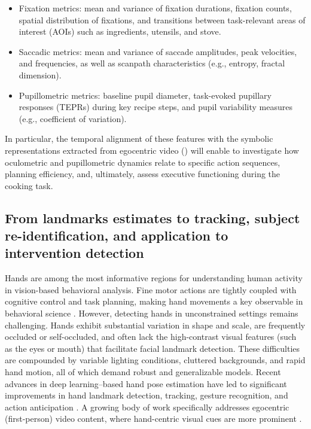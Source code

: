     \begin{itemize}
        \item Fixation metrics: mean and variance of fixation durations, fixation counts, spatial distribution of fixations, and transitions between task-relevant areas of interest (AOIs) such as ingredients, utensils, and stove.
        \item Saccadic metrics: mean and variance of saccade amplitudes, peak velocities, and frequencies, as well as scanpath characteristics (e.g., entropy, fractal dimension).
        \item Pupillometric metrics: baseline pupil diameter, task-evoked pupillary responses (TEPRs) during key recipe steps, and pupil variability measures (e.g., coefficient of variation).
    \end{itemize}
    
    In particular, the temporal alignment of these features with the symbolic representations extracted from egocentric video () will enable to investigate how oculometric and pupillometric dynamics relate to specific action sequences, planning efficiency, and, ultimately, assess executive functioning during the cooking task.


\subsection{From landmarks estimates to tracking, subject re-identification, and application to intervention detection}

    Hands are among the most informative regions for understanding human activity in vision-based behavioral analysis. Fine motor actions are tightly coupled with cognitive control and task planning, making hand movements a key observable in behavioral science \cite{Luxem2023, Friedrich2025}. However, detecting hands in unconstrained settings remains challenging. Hands exhibit substantial variation in shape and scale, are frequently occluded or self-occluded, and often lack the high-contrast visual features (such as the eyes or mouth) that facilitate facial landmark detection. These difficulties are compounded by variable lighting conditions, cluttered backgrounds, and rapid hand motion, all of which demand robust and generalizable models. Recent advances in deep learning–based hand pose estimation have led to significant improvements in hand landmark detection, tracking, gesture recognition, and action anticipation \cite{Friedrich2025, Chen2020}. A growing body of work specifically addresses egocentric (first-person) video content, where hand-centric visual cues are more prominent \cite{ohkawa2023assemblyhandsegocentricactivityunderstanding, Bandini2023}. 

